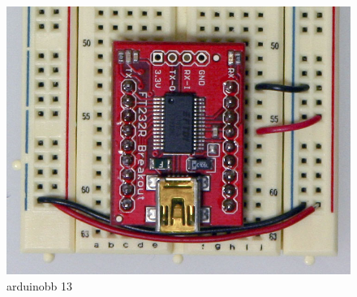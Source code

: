 \begin{figure}[!htb]
 \centering
 \includegraphics[scale=0.3]{img/arduino_breadboard/arduinobb_13.jpg}
 \caption{arduinobb 13}
 \label{arduinobb 13}
\end{figure}


